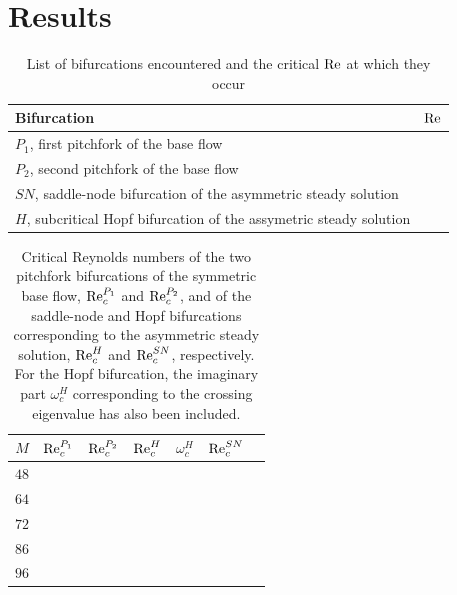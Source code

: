 
\section{Results} \label{sec:res}



\begin{table}[h!]
  \caption{List of bifurcations encountered and the critical $\mathrm{Re}$ at which they
    occur}
  \label{tab:bif_points}
\begin{tabular}{l c}
Bifurcation & $\mathrm{Re}$\\
\hline
$P_1$, first pitchfork of the base flow & \\
$P_2$, second pitchfork of the base flow & \\
$SN$, saddle-node bifurcation of the asymmetric steady solution&  \\
$H$, subcritical Hopf bifurcation of the assymetric steady solution&  \\
\end{tabular}
\end{table}


\begin{table}[h!]
  \caption{Critical Reynolds numbers of the two
    pitchfork bifurcations of the symmetric base flow, $\mathrm{Re}_c^{P_1}$
    and $\mathrm{Re}_c^{P_2}$, and of the saddle-node and Hopf bifurcations
    corresponding to the asymmetric steady solution, $\mathrm{Re}_c^{H}$ and
    $\mathrm{Re}_c^{SN}$, respectively. For the Hopf bifurcation, the imaginary part
    $\omega_c^{H}$ corresponding to the crossing eigenvalue has also been
    included.}
  \label{tab:re_crit}
\begin{tabular}{crrrrrr}
$M$ & $\mathrm{Re}_c^{P_1}$ & $\mathrm{Re}_c^{P_2}$ & $\mathrm{Re}_c^{H}$ &  $\omega_c^{H}$ & $\mathrm{Re}_c^{SN}$  \\
\hline
$48$ &  & &          &          &   \\
$64$ &  & &          &          &   \\
$72$ &  & &          &          &   \\
$86$ &  & &          &          &   \\
$96$ &  & &          &          &   \\
\end{tabular}
\end{table}

